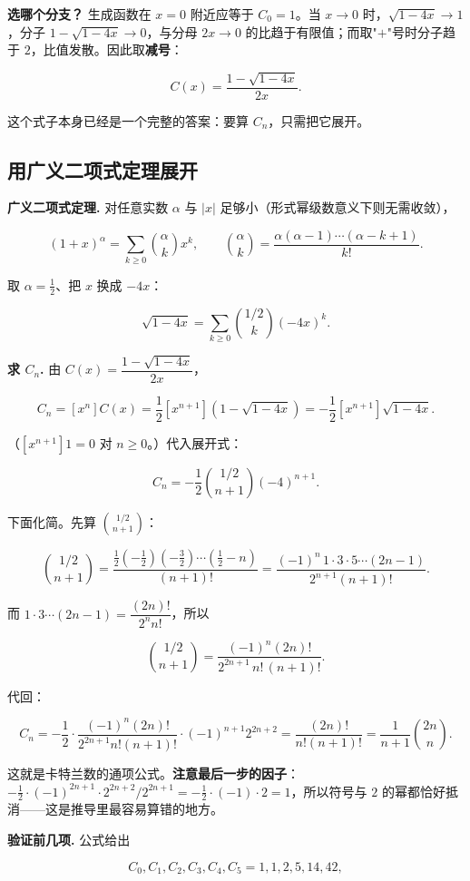 \textbf{选哪个分支？} 生成函数在 $x=0$ 附近应等于 $C_0=1$。当 $x\to0$ 时，$\sqrt{1-4x}\to1$，分子 $1-\sqrt{1-4x}\to0$，与分母 $2x\to0$ 的比趋于有限值；而取"$+$"号时分子趋于 $2$，比值发散。因此取\textbf{减号}：

\[
C(x)=\frac{1-\sqrt{1-4x}}{2x}.
\]

这个式子本身已经是一个完整的答案：要算 $C_n$，只需把它展开。

\subsection{用广义二项式定理展开}


\textbf{广义二项式定理.} 对任意实数 $\alpha$ 与 $|x|$ 足够小（形式幂级数意义下则无需收敛），

\[
(1+x)^\alpha=\sum_{k\ge0}\binom{\alpha}{k}x^k,\qquad
\binom{\alpha}{k}=\frac{\alpha(\alpha-1)\cdots(\alpha-k+1)}{k!}.
\]

取 $\alpha=\frac12$、把 $x$ 换成 $-4x$：

\[
\sqrt{1-4x}=\sum_{k\ge0}\binom{1/2}{k}(-4x)^k.
\]

\textbf{求 $C_n$.} 由 $C(x)=\dfrac{1-\sqrt{1-4x}}{2x}$，

\[
C_n=[x^n]C(x)=\frac12[x^{n+1}]\left(1-\sqrt{1-4x}\right)
=-\frac12[x^{n+1}]\sqrt{1-4x}.
\]

（$[x^{n+1}]1=0$ 对 $n\ge0$。）代入展开式：

\[
C_n=-\frac12\binom{1/2}{n+1}(-4)^{n+1}.
\]

下面化简。先算 $\binom{1/2}{n+1}$：

\[
\binom{1/2}{n+1}
=\frac{\frac12\left(-\frac12\right)\left(-\frac32\right)\cdots\left(\frac12-n\right)}{(n+1)!}
=\frac{(-1)^n\,1\cdot3\cdot5\cdots(2n-1)}{2^{n+1}(n+1)!}.
\]

而 $1\cdot3\cdots(2n-1)=\dfrac{(2n)!}{2^nn!}$，所以

\[
\binom{1/2}{n+1}=\frac{(-1)^n(2n)!}{2^{2n+1}\,n!\,(n+1)!}.
\]

代回：

\[
C_n=-\frac12\cdot\frac{(-1)^n(2n)!}{2^{2n+1}n!(n+1)!}\cdot(-1)^{n+1}2^{2n+2}
=\frac{(2n)!}{n!(n+1)!}
=\frac{1}{n+1}\binom{2n}{n}.
\]

这就是卡特兰数的通项公式。\textbf{注意最后一步的因子}：$-\frac12\cdot(-1)^{2n+1}\cdot2^{2n+2}/2^{2n+1}=-\frac12\cdot(-1)\cdot2=1$，所以符号与 $2$ 的幂都恰好抵消——这是推导里最容易算错的地方。

\textbf{验证前几项.} 公式给出

\[
C_0,C_1,C_2,C_3,C_4,C_5=1,1,2,5,14,42,
\]

